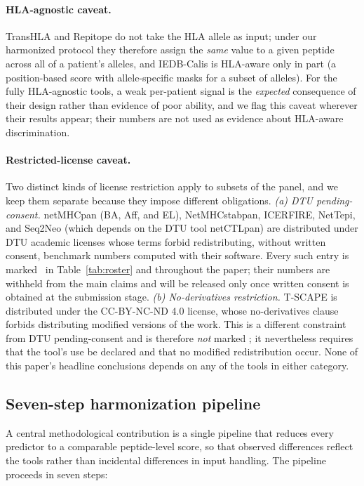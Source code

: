 \paragraph{HLA-agnostic caveat.} TransHLA and Repitope do not take the HLA allele
as input; under our harmonized protocol they therefore assign the \emph{same}
value to a given peptide across all of a patient's alleles, and IEDB-Calis is
HLA-aware only in part (a position-based score with allele-specific masks for a
subset of alleles). For the fully HLA-agnostic tools, a weak per-patient signal
is the \emph{expected} consequence of their design rather than evidence of poor
ability, and we flag this caveat wherever their results appear; their numbers are
not used as evidence about HLA-aware discrimination.

\paragraph{Restricted-license caveat.} Two distinct kinds of license restriction
apply to subsets of the panel, and we keep them separate because they impose
different obligations. \emph{(a) DTU pending-consent.} netMHCpan (BA, Aff, and
EL), NetMHCstabpan, ICERFIRE, NetTepi, and Seq2Neo (which depends on the DTU tool
netCTLpan) are distributed under DTU academic licenses whose terms forbid
redistributing, without written consent, benchmark numbers computed with their
software. Every such entry is marked \pendingDTU\ in Table~\ref{tab:roster} and
throughout the paper; their numbers are withheld from the main claims and will be
released only once written consent is obtained at the submission stage.
\emph{(b) No-derivatives restriction.} T-SCAPE is distributed under the
CC-BY-NC-ND 4.0 license, whose no-derivatives clause forbids distributing modified
versions of the work. This is a different constraint from DTU pending-consent and
is therefore \emph{not} marked \pendingDTU; it nevertheless requires that the
tool's use be declared and that no modified redistribution occur. None of this
paper's headline conclusions depends on any of the tools in either category.

\subsection{Seven-step harmonization pipeline}
\label{sec:harmonization}

A central methodological contribution is a single pipeline that reduces every
predictor to a comparable peptide-level score, so that observed differences
reflect the tools rather than incidental differences in input handling. The
pipeline proceeds in seven steps:

